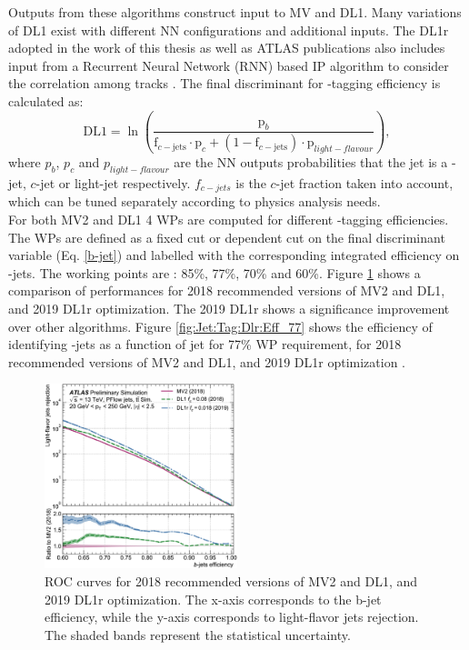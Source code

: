 Outputs from these algorithms construct input to MV and DL1. Many variations of DL1 exist with different NN configurations and additional inputs. The DL1r adopted in the work of this thesis as well as ATLAS publications also includes input from a Recurrent Neural Network (RNN) based IP algorithm to consider the correlation among tracks \cite{DL1r}. The final discriminant for \bq-tagging efficiency is calculated as:
\begin{equation}
    \mathrm{DL} 1=\ln \left(\frac{\mathrm{p}_{b}}{\mathrm{f}_{c-\mathrm{jets}} \cdot \mathrm{p}_{c}+\left(1-\mathrm{f}_{c-\mathrm{jets}}\right) \cdot \mathrm{p}_{light-flavour }}\right),
    \label{b-jet}
\end{equation}
where $p_b$, $p_c$ and $p_{light-flavour}$ are the NN outputs probabilities that the jet is a \bq-jet, $c$-jet or light-jet respectively. $f_{c-jets}$ is the $c$-jet fraction taken into account, which can be tuned separately according to physics analysis needs. \\  
For both MV2 and DL1 4 WPs are computed for different \bq-tagging efficiencies. The WPs are defined as a fixed cut or \pT dependent cut on the final discriminant variable (Eq. \ref{b-jet}) and labelled with the corresponding integrated efficiency on \bq-jets. The working points are : 85\%, 77\%, 70\% and 60\%. Figure \ref{fig:Jet:Tag:Dlr:Eff} shows a comparison of performances for 2018 recommended versions of MV2 and DL1, and 2019 DL1r optimization. The 2019 DL1r shows a significance improvement over other algorithms. Figure \ref{fig:Jet:Tag:Dlr:Eff_77} shows the efficiency of identifying \bq-jets as a function of jet \pT for 77\% WP requirement, for 2018 recommended versions of MV2 and DL1, and 2019 DL1r optimization \cite{Btag_Perf}. 
\begin{figure}[htbp]
    \centering
    \includegraphics[width=0.5\textwidth]{Ch4/Img/b_jet_Eff.png}
    \caption{ROC curves for 2018 recommended versions of MV2 and DL1, and 2019 DL1r optimization. The x-axis corresponds to the b-jet efficiency, while the y-axis corresponds to light-flavor jets rejection. The shaded bands represent the statistical uncertainty.}
    \label{fig:Jet:Tag:Dlr:Eff}
\end{figure}
